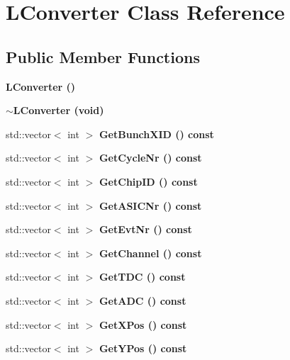 \section{LConverter Class Reference}
\label{classLConverter}
\subsection*{Public Member Functions}
\begin{CompactItemize}
\item 
\bf{LConverter} ()\label{classLConverter_cfad6ad0ca0baddc2df99a9502bd4779}

\item 
\bf{$\sim$LConverter} (void)\label{classLConverter_46396dfef3d2b3bbd316dea8e2095921}

\item 
std::vector$<$ int $>$ \bf{Get\-Bunch\-XID} () const \label{classLConverter_6cf5bcd449fe8bcac01236d145cb4f59}

\item 
std::vector$<$ int $>$ \bf{Get\-Cycle\-Nr} () const \label{classLConverter_d0208a6b7eb29cef8eb8a8114bb74e36}

\item 
std::vector$<$ int $>$ \bf{Get\-Chip\-ID} () const \label{classLConverter_36f7b8e049de407a26eb634f1c5427d5}

\item 
std::vector$<$ int $>$ \bf{Get\-ASICNr} () const \label{classLConverter_d89bc864bf4a629cbb889d8d60f56d05}

\item 
std::vector$<$ int $>$ \bf{Get\-Evt\-Nr} () const \label{classLConverter_0976759e79ba18649606a315d2af1a47}

\item 
std::vector$<$ int $>$ \bf{Get\-Channel} () const \label{classLConverter_30f1410318174222d0025b0c29011e88}

\item 
std::vector$<$ int $>$ \bf{Get\-TDC} () const \label{classLConverter_67be006deee7f41f35d4595da3e3e915}

\item 
std::vector$<$ int $>$ \bf{Get\-ADC} () const \label{classLConverter_42ca4db1d2c17ed158d49e9f8fe85657}

\item 
std::vector$<$ int $>$ \bf{Get\-XPos} () const \label{classLConverter_d8004446554a8adffa901009931ea9a9}

\item 
std::vector$<$ int $>$ \bf{Get\-YPos} () const \label{classLConverter_f7d3b005a349a1f73b25a6c1aec11d3e}


\end{CompactItemize}

